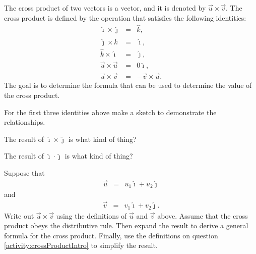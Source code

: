 \begin{problem}
\item The cross product of two vectors is a vector, and it is denoted by $\vec{u}\times\vec{v}$.
The cross product is defined by the operation that satisfies the following identities:
  \begin{eqnarray*}
    \hat{\imath} \times \hat{\jmath} & = & \hat{k}, \\
    \hat{\jmath} \times \hat{k} & = & \hat{\imath}, \\
    \hat{k} \times \hat{\imath} & = & \hat{\jmath}, \\
    \vec{u} \times \vec{u} & = & 0 \hat{\imath}, \\
    \vec{u} \times \vec{v} & = & - \vec{v} \times \vec{u}.
  \end{eqnarray*}
  The goal is to determine the formula that can be used to determine the value of the cross product.
  \label{activity:crossProductIntro}
  \begin{subproblem}
  \item For the first three identities above make a sketch to
    demonstrate the relationships.
    \vfill

    \item The result of $\hat{\imath}\times\hat{\jmath}$ is what kind of thing?
    \vspace{3em}

    \item The result of $\hat{\imath}\cdot\hat{\jmath}$ is what kind of thing?
    \vspace{3em}

    \clearpage

  \item Suppose that
    \begin{eqnarray*}
      \vec{u} & = & u_1 \hat{\imath} + u_2 \hat{\jmath}
    \end{eqnarray*}
    and
    \begin{eqnarray*}
      \vec{v} & = & v_1 \hat{\imath} + v_2 \hat{\jmath}.
    \end{eqnarray*}
    Write out $\vec{u}\times\vec{v}$ using the definitions of $\vec{u}$ and $\vec{v}$ above.
    Assume that the cross product obeys the distributive rule.
    Then expand the result to derive a general formula for the cross product.
    Finally, use the definitions on question \ref{activity:crossProductIntro} to simplify the result.
    \vfill
    \vfill


\end{subproblem}
\end{problem}

